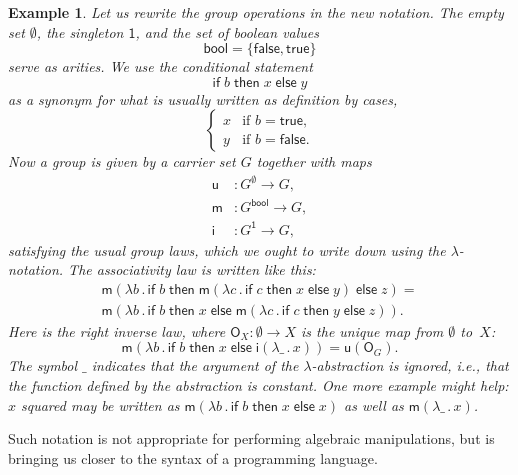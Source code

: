 \documentclass{amsart}
\newcommand{\set}[1]{\{#1\}} %
\newcommand{\lam}[1]{\lambda #1 \,.\,}
\newcommand{\one}{\mathsf{1}} %
\newcommand{\bool}{\mathsf{bool}} %
\newcommand{\true}{\mathsf{true}}
\newcommand{\false}{\mathsf{false}}
\newcommand{\cond}[3]{\mathsf{if}\;#1\;\mathsf{then}\;#2\;\mathsf{else}\;#3}
\newtheorem{example}{Example}[section]
\begin{document}
\begin{example}
  Let us rewrite the group operations in the new notation. The empty set
  $\emptyset$, the singleton $\one$, and the set of boolean values
  \begin{equation*}
    \bool = \set{\false, \true}
  \end{equation*}
  serve as arities. We use the conditional statement
  \begin{equation*}
    \cond{b}{x}{y}
  \end{equation*}
  as a synonym for what is usually written as definition by cases,
  \begin{equation*}
  \begin{cases}
      x & \text{if $b = \true$,}\\
      y & \text{if $b = \false$.}
    \end{cases}
  \end{equation*}
  Now a group is given by a carrier set $G$ together with maps
  \begin{align*}
    \mathsf{u} &: G^\emptyset \to G,\\
    \mathsf{m} &: G^\bool \to G,\\
    \mathsf{i} &: G^\one \to G,
  \end{align*}
  satisfying the usual group laws, which we ought to write down using the
  $\lambda$-notation. The associativity law is written like this:
  \begin{multline*}
    \mathsf{m}(\lam{b} \cond{b}{\mathsf{m}(\lam{c}\cond{c}{x}{y})}{z}) = \\
    \mathsf{m}(\lam{b} \cond{b}{x}{\mathsf{m}(\lam{c} \cond{c}{y}{z})}).
  \end{multline*}
  Here is the right inverse law, where $\mathsf{O}_X : \emptyset \to X$ is
  the unique map from $\emptyset$ to~$X$:
  \begin{equation*}
    \mathsf{m}(\lam{b} \cond{b}{x}{\mathsf{i}(\lam{\_}{x})}) =
    \mathsf{u}(\mathsf{O}_G).
  \end{equation*}
  The symbol $\_$ indicates that the argument of the $\lambda$-abstraction is
  ignored, i.e., that the function defined by the abstraction is constant. One
  more example might help: $x$ squared may be written as
  $\mathsf{m}(\lam{b} \cond{b}{x}{x})$ as well as $\mathsf{m}(\lam{\_} x)$.
\end{example}

Such notation is not appropriate for performing algebraic manipulations, but is
bringing us closer to the syntax of a programming language.
\end{document}
